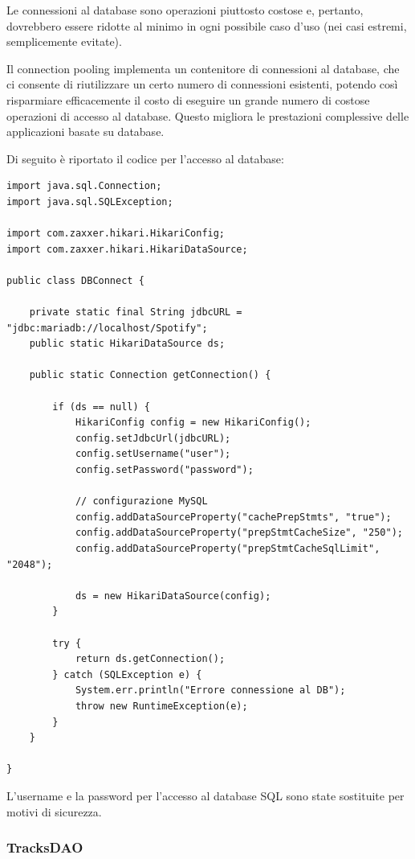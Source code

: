 \documentclass[12pt, a4paper]{article}
\begin{document}
Le connessioni al database sono operazioni piuttosto costose e, pertanto, dovrebbero essere ridotte al minimo in ogni possibile caso d'uso (nei casi estremi, semplicemente evitate).

Il connection pooling implementa un contenitore di connessioni al database, che ci consente di riutilizzare un certo numero di connessioni esistenti, potendo così risparmiare efficacemente il costo di eseguire un grande numero di costose operazioni di accesso al database. Questo migliora le prestazioni complessive delle applicazioni basate su database.

Di seguito è riportato il codice per l'accesso al database:

\begin{lstlisting}
import java.sql.Connection;
import java.sql.SQLException;

import com.zaxxer.hikari.HikariConfig;
import com.zaxxer.hikari.HikariDataSource;

public class DBConnect {
		
	private static final String jdbcURL = "jdbc:mariadb://localhost/Spotify";
	public static HikariDataSource ds;
		
	public static Connection getConnection() {
			
		if (ds == null) {
			HikariConfig config = new HikariConfig();
			config.setJdbcUrl(jdbcURL);
			config.setUsername("user");
			config.setPassword("password");
				
			// configurazione MySQL
			config.addDataSourceProperty("cachePrepStmts", "true");
			config.addDataSourceProperty("prepStmtCacheSize", "250");
			config.addDataSourceProperty("prepStmtCacheSqlLimit", "2048");
				
			ds = new HikariDataSource(config);
		}
			
		try {	
			return ds.getConnection();
		} catch (SQLException e) {
			System.err.println("Errore connessione al DB");
			throw new RuntimeException(e);
		}
	}

}
\end{lstlisting}

L'username e la password per l'accesso al database SQL sono state sostituite per motivi di sicurezza.

\subsubsection{TracksDAO}
\end{document}
